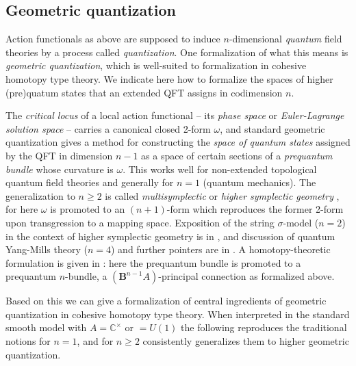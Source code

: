\documentclass[copyright]{eptcs}
\begin{document}
\subsection{Geometric quantization}
\label{GeometricQuantization}

Action functionals as above are supposed to induce $n$-dimensional \emph{quantum} field theories
by a process called \emph{quantization}. One formalization of what this means is
\emph{geometric quantization}, which is well-suited to formalization in
cohesive homotopy type theory. We indicate here how to formalize the spaces of
higher (pre)quatum states that an extended QFT assigns in codimension $n$.

The \emph{critical locus} of a
local action functional -- its \emph{phase space} or
\emph{Euler-Lagrange solution space} -- carries a canonical closed 2-form $\omega$,
and standard geometric quantization gives a method for constructing the
\emph{space of quantum states} assigned by the QFT in dimension $n-1$
as a space of certain sections of a
\emph{prequantum bundle} whose curvature is $\omega$.
This works well for non-extended topological quantum field theories and generally for
$n = 1$ (quantum mechanics). The generalization to $n \geq 2$ is
called \emph{multisymplectic} or \emph{higher symplectic geometry} \cite{CR},
for here $\omega$ is promoted to an $(n+1)$-form which reproduces the former 2-form
upon transgression to a mapping space. Exposition of the string $\sigma$-model
($n = 2$) in the context of higher symplectic geometry is in \cite{BHR},
and discussion of quantum Yang-Mills theory ($n = 4$)
and further pointers are in \cite{Kan}.
A homotopy-theoretic formulation is given in \cite{SchreiberErlangen}: here the prequantum
bundle is promoted to a prequantum $n$-bundle, a $(\mathbf{B}^{n-1}A)$-principal connection
as formalized above.

Based on this we can give a formalization of central ingredients of geometric quantization in
cohesive homotopy type theory. When interpreted in the standard smooth model with $A = \mathbb{C}^\times$ or $= U(1)$ the following reproduces the traditional notions for $n = 1$, and for $n \geq 2$ consistently generalizes them to higher
geometric quantization.
\end{document}
